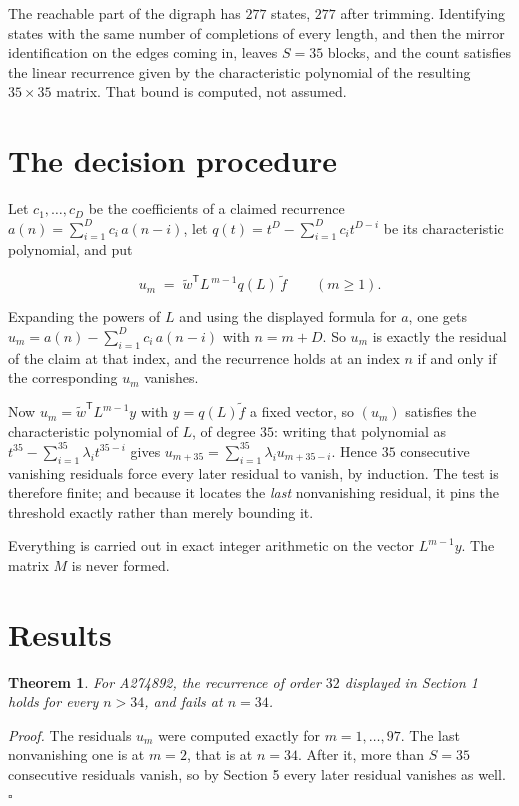 \documentclass[11pt]{article}
\newtheorem{theorem}{Theorem}
\theoremstyle{definition}
\begin{document}
The reachable part of the digraph has $277$ states, $277$ after trimming. Identifying states with the same number of completions of every length, and then the mirror identification on the edges coming in, leaves $S = 35$ blocks, and the count satisfies the linear recurrence given by the characteristic polynomial of the resulting $35\times35$ matrix. That bound is computed, not assumed.

\section{The decision procedure}

Let $c_1,\dots,c_D$ be the coefficients of a claimed recurrence $a(n) = \sum_{i=1}^{D} c_i\,a(n-i)$, let $q(t) = t^{D} - \sum_{i=1}^{D} c_i t^{D-i}$ be its characteristic polynomial, and put

\[u_m \;=\; \tilde w^{\mathsf T} L^{\,m-1} q(L)\,\tilde f \qquad (m \ge 1).\]

Expanding the powers of $L$ and using the displayed formula for $a$, one gets $u_m = a(n) - \sum_{i=1}^{D} c_i\,a(n-i)$ with $n = m + D$. So $u_m$ is exactly the residual of the claim at that index, and the recurrence holds at an index $n$ if and only if the corresponding $u_m$ vanishes.

Now $u_m = \tilde w^{\mathsf T} L^{m-1} y$ with $y = q(L)\tilde f$ a fixed vector, so $(u_m)$ satisfies the characteristic polynomial of $L$, of degree $35$: writing that polynomial as $t^{35} - \sum_{i=1}^{35} \lambda_i t^{35-i}$ gives $u_{m+35} = \sum_{i=1}^{35} \lambda_i u_{m+35-i}$. Hence $35$ consecutive vanishing residuals force every later residual to vanish, by induction. The test is therefore finite; and because it locates the {\itshape last} nonvanishing residual, it pins the threshold exactly rather than merely bounding it.

Everything is carried out in exact integer arithmetic on the vector $L^{m-1}y$. The matrix $M$ is never formed.

\section{Results}

\begin{theorem} For A274892, the recurrence of order $32$ displayed in Section 1 holds for every $n > 34$, and fails at $n = 34$.\end{theorem}

{\itshape Proof.} The residuals $u_m$ were computed exactly for $m = 1,\dots,97$. The last nonvanishing one is at $m = 2$, that is at $n = 34$. After it, more than $S = 35$ consecutive residuals vanish, so by Section 5 every later residual vanishes as well. $\square$
\end{document}
